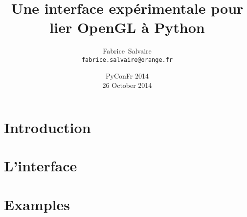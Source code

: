 




\title[]{Une interface expérimentale pour lier OpenGL à Python}
\author[F.~Salvaire]{Fabrice~Salvaire \\ \texttt{fabrice.salvaire@orange.fr}}
\date[26 oct 14]{PyConFr 2014 \\ 26 October 2014}




%
%

\begin{frame} %
  \titlepage
\end{frame}

%
%

\frame{\tableofcontents}

%
%

\section{Introduction}

\section{L'interface}
\section{Examples}



